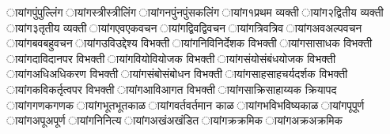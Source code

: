 \छायांग{पुं}{पुल्लिंग} %
\छायांग{स्त्री}{स्त्रीलिंग} %
\छायांग{नपुं}{नपुंसकलिंग} %
\छायांग{१}{प्रथम व्यक्ती} %
\छायांग{२}{द्वितीय व्यक्ती} %
\छायांग{३}{तृतीय व्यक्ती} %
\छायांग{एव}{एकवचन} %
\छायांग{द्विव}{द्विवचन} %
\छायांग{त्रिव}{त्रिव} %
\छायांग{अव}{अल्पवचन} %
\छायांग{बव}{बहुवचन} %
\छायांग{उवि}{उद्देश्य विभक्ती} %
\छायांग{निवि}{निर्देशक विभक्ती} %
\छायांग{सा}{साधक विभक्ती} %
\छायांग{दावि}{दानपर विभक्ती} %
\छायांग{वियो}{वियोजक विभक्ती} %
\छायांग{संयो}{संबंधयोजक विभक्ती} %
\छायांग{अधि}{अधिकरण विभक्ती} %
\छायांग{संबो}{संबोधन विभक्ती} %
\छायांग{साह}{साहचर्यदर्शक विभक्ती} %
\छायांग{कवि}{कर्तृत्वपर विभक्ती} %
\छायांग{आवि}{आगत विभक्ती} %
\छायांग{साक्रि}{साहाय्यक क्रियापद} %
\छायांग{गणक}{गणक} %
\छायांग{भूत}{भूतकाळ} %
\छायांग{वर्त}{वर्तमान काळ} %
\छायांग{भवि}{भविष्यकाळ} %
\छायांग{पू}{पूर्ण} %
\छायांग{अपू}{अपूर्ण} %
\छायांग{नि}{नित्य} %
\छायांग{अखं}{अखंडित} %
\छायांग{क्र}{क्रमिक} %
\छायांग{अक्र}{अक्रमिक} %